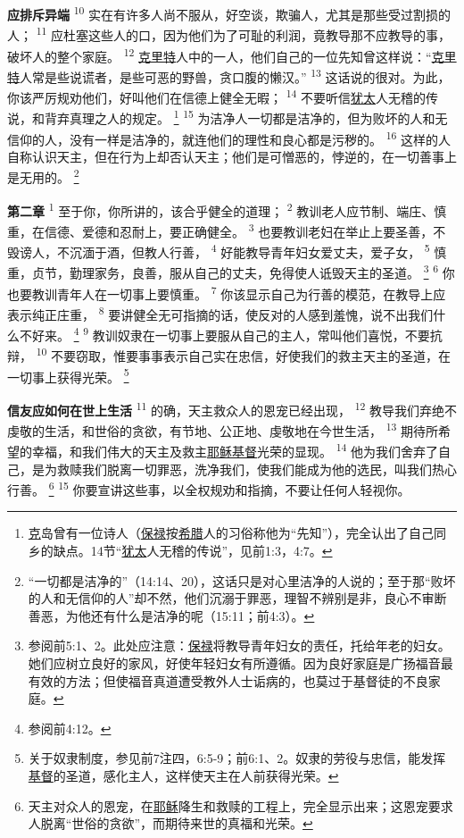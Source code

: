 \begin{multicols}{2}
\textbf{应排斥异端\quad}
\textsuperscript{10}
实在有许多人尚不服从，好空谈，欺骗人，尤其是那些受过割损的人；
\textsuperscript{11}
应杜塞这些人的口，因为他们为了可耻的利润，竟教导那不应教导的事，破坏人的整个家庭。
\textsuperscript{12}
\uline{克里特}人中的一人，他们自己的一位先知曾这样说：“\uline{克里特}人常是些说谎者，是些可恶的野兽，贪口腹的懒汉。”
\textsuperscript{13}
这话说的很对。为此，你该严厉规劝他们，好叫他们在信德上健全无暇；
\textsuperscript{14}
不要听信\uline{犹太}人无稽的传说，和背弃真理之人的规定。
\footnote{\uline{克}岛曾有一位诗人（\uline{保禄}按\uline{希腊}人的习俗称他为“先知”），完全认出了自己同乡的缺点。14节“\uline{犹太}人无稽的传说”，见前1:3，4:7。}
\textsuperscript{15}
为洁净人一切都是洁净的，但为败坏的人和无信仰的人，没有一样是洁净的，就连他们的理性和良心都是污秽的。
\textsuperscript{16}
这样的人自称认识天主，但在行为上却否认天主；他们是可憎恶的，悖逆的，在一切善事上是无用的。
\footnote{“一切都是洁净的”（14:14、20），这话只是对心里洁净的人说的；至于那“败坏的人和无信仰的人”却不然，他们沉溺于罪恶，理智不辨别是非，良心不审断善恶，为他还有什么是洁净的呢（15:11；前4:3）。}

\textbf{第二章\quad}
\textsuperscript{1}
至于你，你所讲的，该合乎健全的道理；
\textsuperscript{2}
教训老人应节制、端庄、慎重，在信德、爱德和忍耐上，要正确健全。
\textsuperscript{3}
也要教训老妇在举止上要圣善，不毁谤人，不沉湎于酒，但教人行善，
\textsuperscript{4}
好能教导青年妇女爱丈夫，爱子女，
\textsuperscript{5}
慎重，贞节，勤理家务，良善，服从自己的丈夫，免得使人诋毁天主的圣道。
\footnote{参阅前5:1、2。此处应注意：\uline{保禄}将教导青年妇女的责任，托给年老的妇女。她们应树立良好的家风，好使年轻妇女有所遵循。因为良好家庭是广扬福音最有效的方法；但使福音真道遭受教外人士诟病的，也莫过于基督徒的不良家庭。}
\textsuperscript{6}
你也要教训青年人在一切事上要慎重。
\textsuperscript{7}
你该显示自己为行善的模范，在教导上应表示纯正庄重，
\textsuperscript{8}
要讲健全无可指摘的话，使反对的人感到羞愧，说不出我们什么不好来。
\footnote{参阅前4:12。}
\textsuperscript{9}
教训奴隶在一切事上要服从自己的主人，常叫他们喜悦，不要抗辩，
\textsuperscript{10}
不要窃取，惟要事事表示自己实在忠信，好使我们的救主天主的圣道，在一切事上获得光荣。
\footnote{关于奴隶制度，参见前7注四，6:5-9；前6:1、2。奴隶的劳役与忠信，能发挥\uline{基督}的圣道，感化主人，这样使天主在人前获得光荣。}

\textbf{信友应如何在世上生活\quad}
\textsuperscript{11}
的确，天主救众人的恩宠已经出现，
\textsuperscript{12}
教导我们弃绝不虔敬的生活，和世俗的贪欲，有节地、公正地、虔敬地在今世生活，
\textsuperscript{13}
期待所希望的幸福，和我们伟大的天主及救主\uline{耶稣}\uline{基督}光荣的显现。
\textsuperscript{14}
他为我们舍弃了自己，是为救赎我们脱离一切罪恶，洗净我们，使我们能成为他的选民，叫我们热心行善。
\footnote{天主对众人的恩宠，在\uline{耶稣}降生和救赎的工程上，完全显示出来；这恩宠要求人脱离“世俗的贪欲”，而期待来世的真福和光荣。}
\textsuperscript{15}
你要宣讲这些事，以全权规劝和指摘，不要让任何人轻视你。


\end{multicols}
